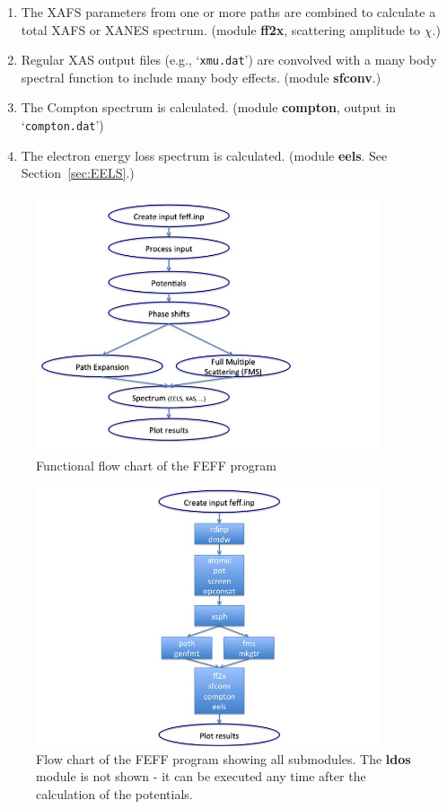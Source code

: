 \documentclass[11pt,oneside]{report} %
\newcommand{\file}[1]{`\texttt{#1}'}
\newcommand{\module}[1]{\textrm{\bf{#1}}}
\begin{document}
\begin{enumerate}
\item  The XAFS parameters from one or more paths are combined to
calculate a total XAFS or XANES spectrum.
(module \module{ff2x}, scattering amplitude to $\chi$.)

\item Regular XAS output files (e.g., \file{xmu.dat})
are convolved with a many body spectral function to include many body effects.
(module \module{sfconv}.)

\item The Compton spectrum is calculated. (module \module{compton}, output in \file{compton.dat})

\item The electron energy loss spectrum is calculated. (module  \module{eels}. See Section~\ref{sec:EELS}.)

\end{enumerate}


\begin{figure}[H]
	\centering
		\includegraphics[height=3.0in]{flow1.jpg}
		\caption{Functional flow chart of the FEFF program}   
	\label{fig:flow1}
\end{figure}

\begin{figure}[H]
	\centering
		\includegraphics[height=3.0in]{flow3.jpg}
		\caption{Flow chart of the FEFF program showing all submodules.  The \module{ldos} module is not shown - it can be executed any time after the calculation of the potentials.}   
	\label{fig:flow3}
\end{figure}
\end{document}
